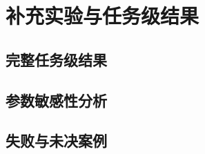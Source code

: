 \section{补充实验与任务级结果}
\mbox{}\par
\subsection{完整任务级结果}
\mbox{}\par
\subsection{参数敏感性分析}
\mbox{}\par
\subsection{失败与未决案例}
\mbox{}\par
